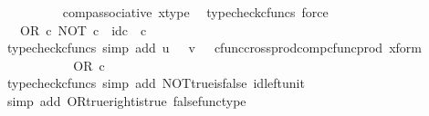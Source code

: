 \begin{isabellebody}
\ \ \ \ \ \ \ \ \isamarkupfalse%
\ comp{\isacharunderscore}{\kern0pt}associative{}\ x{\isacharunderscore}{\kern0pt}type\ \isamarkupfalse%
\ {\isacharparenleft}{\kern0pt}typecheck{\isacharunderscore}{\kern0pt}cfuncs{\isacharcomma}{\kern0pt}\ force{\isacharparenright}{\kern0pt}\isanewline
\ \ \ \ \ \ \isamarkupfalse%
\ \isamarkupfalse%
\ {\isachardoublequoteopen}{\isachardot}{\kern0pt}{\isachardot}{\kern0pt}{\isachardot}{\kern0pt}\ {\isacharequal}{\kern0pt}\ OR\ {\isasymcirc}\isactrlsub c\ {\isasymlangle}NOT\ {\isasymcirc}\isactrlsub c\ {\isasymt}{\isacharcomma}{\kern0pt}\ id\isactrlsub c\ {\isasymOmega}\ {\isasymcirc}\isactrlsub c\ {\isasymt}{\isasymrangle}{\isachardoublequoteclose}\isanewline
\ \ \ \ \ \ \ \ \isamarkupfalse%
\ {\isacharparenleft}{\kern0pt}typecheck{\isacharunderscore}{\kern0pt}cfuncs{\isacharcomma}{\kern0pt}\ simp\ add{\isacharcolon}{\kern0pt}\ {\isacartoucheopen}u\ {\isacharequal}{\kern0pt}\ {\isasymt}{\isacartoucheclose}\ {\isacartoucheopen}v\ {\isacharequal}{\kern0pt}\ {\isasymt}{\isacartoucheclose}\ cfunc{\isacharunderscore}{\kern0pt}cross{\isacharunderscore}{\kern0pt}prod{\isacharunderscore}{\kern0pt}comp{\isacharunderscore}{\kern0pt}cfunc{\isacharunderscore}{\kern0pt}prod\ x{\isacharunderscore}{\kern0pt}form{\isacharparenright}{\kern0pt}\isanewline
\ \ \ \ \ \ \isamarkupfalse%
\ \isamarkupfalse%
\ {\isachardoublequoteopen}{\isachardot}{\kern0pt}{\isachardot}{\kern0pt}{\isachardot}{\kern0pt}\ {\isacharequal}{\kern0pt}\ OR\ {\isasymcirc}\isactrlsub c\ {\isasymlangle}{\isasymf}{\isacharcomma}{\kern0pt}\ {\isasymt}{\isasymrangle}{\isachardoublequoteclose}\isanewline
\ \ \ \ \ \ \ \ \isamarkupfalse%
\ {\isacharparenleft}{\kern0pt}typecheck{\isacharunderscore}{\kern0pt}cfuncs{\isacharcomma}{\kern0pt}\ simp\ add{\isacharcolon}{\kern0pt}\ NOT{\isacharunderscore}{\kern0pt}true{\isacharunderscore}{\kern0pt}is{\isacharunderscore}{\kern0pt}false\ id{\isacharunderscore}{\kern0pt}left{\isacharunderscore}{\kern0pt}unit{}{\isacharparenright}{\kern0pt}\isanewline
\ \ \ \ \ \ \isamarkupfalse%
\ \isamarkupfalse%
\ {\isachardoublequoteopen}{\isachardot}{\kern0pt}{\isachardot}{\kern0pt}{\isachardot}{\kern0pt}\ {\isacharequal}{\kern0pt}\ {\isasymt}{\isachardoublequoteclose}\isanewline
\ \ \ \ \ \ \ \ \isamarkupfalse%
\ {\isacharparenleft}{\kern0pt}simp\ add{\isacharcolon}{\kern0pt}\ OR{\isacharunderscore}{\kern0pt}true{\isacharunderscore}{\kern0pt}right{\isacharunderscore}{\kern0pt}is{\isacharunderscore}{\kern0pt}true\ false{\isacharunderscore}{\kern0pt}func{\isacharunderscore}{\kern0pt}type{\isacharparenright}{\kern0pt}\isanewline

\end{isabellebody}
